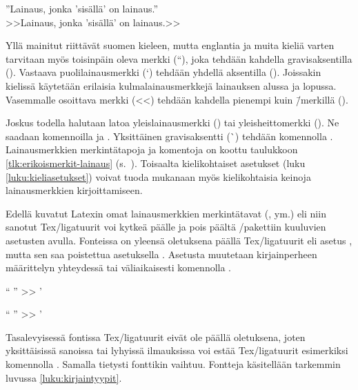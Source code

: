 \begin{tulossis}
  ''Lainaus, jonka 'sisällä' on lainaus.'' \\
  >>Lainaus, jonka 'sisällä' on lainaus.>>
\end{tulossis}

Yllä mainitut riittävät suomen kieleen, mutta englantia ja muita kieliä
varten tarvitaan myös toisinpäin oleva merkki (``), joka tehdään
kahdella gra\-vis\-ak\-sen\-til\-la (). Vastaava
puolilainausmerkki (`) tehdään yhdellä aksentilla (). Joissakin
kielissä käytetään erilaisia kulmalainausmerkkejä lainauksen alussa ja
lopussa. Vasemmalle osoittava merkki (<<) tehdään kahdella pienempi kuin
\=/merkillä (\koodi{<<}).

Joskus%
todella halutaan latoa yleislainausmerkki (\textquotedbl) tai
yleisheittomerkki (\textquotesingle). Ne saadaan komennoilla
 ja .
Yksittäinen gra\-vis\-ak\-sent\-ti (\`{}) tehdään komennolla
. Lainausmerkkien merkintätapoja ja komentoja on
koottu taulukkoon \ref{tlk:erikoismerkit-lainaus}
(s.~\pageref{tlk:erikoismerkit-lainaus}). Toisaalta kielikohtaiset
asetukset (luku \ref{luku:kieliasetukset}) voivat tuoda mukanaan myös
kielikohtaisia keinoja lainausmerkkien kirjoittamiseen.

Edellä kuvatut Latexin omat lainausmerkkien merkintätavat (,
\koodi{>>} ym.) eli niin sanotut Tex\-/ligatuurit voi kytkeä päälle ja
pois päältä \-/pakettiin kuuluvien asetusten avulla.
Fonteissa on yleensä oletuksena päällä Tex\-/ligatuurit eli asetus
, mutta sen saa poistettua asetuksella
. Asetusta muutetaan kirjainperheen
määrittelyn yhteydessä tai väliaikaisesti komennolla .


\begin{koodilohkosis}
  { `` '' >> '}
\end{koodilohkosis}

\begin{tulossis}
  { `` '' >> '}
\end{tulossis}


Tasalevyisessä fontissa Tex\-/ligatuurit eivät ole päällä oletuksena,
joten yksittäisissä sanoissa tai lyhyissä ilmauksissa voi estää
Tex\-/ligatuurit esimerkiksi komennolla . Samalla
tietysti fonttikin vaihtuu. Fontteja käsitellään tarkemmin luvussa
\ref{luku:kirjaintyypit}.

